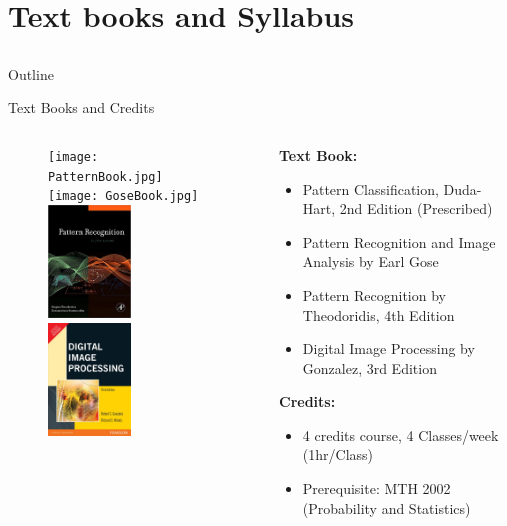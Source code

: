 \section{Text books and Syllabus}
\subsection{}

\begin{frame}[label=12]{Outline}
\tableofcontents
\end{frame}

\begin{frame}{Text Books and Credits}
\begin{columns}
\begin{column}{5cm}
\begin{figure}
\centering
\texttt{[image: PatternBook.jpg]}~~
\texttt{[image: GoseBook.jpg]}\\
\vspace{8pt}
\includegraphics[height = 3cm,width = 2.2cm]{Figures/Book003.jpg}~~
\includegraphics[height = 3cm,width = 2.2cm]{Figures/Book004.jpg}
\end{figure}
\end{column}
\begin{column}{5.4cm}
\begin{footnotesize}
\textbf{Text Book:}
\begin{itemize}
\item Pattern Classification, Duda-Hart, 2nd Edition ({\color{brown}Prescribed})
\item Pattern Recognition and Image Analysis by Earl Gose
\item Pattern Recognition by Theodoridis, 4th Edition
\item Digital Image Processing by Gonzalez, 3rd Edition
\end{itemize}
\textbf{Credits:}
\begin{itemize}
\item 4 credits course, 4 Classes/week (1hr/Class)
\item Prerequisite: MTH 2002 (Probability and Statistics)
\end{itemize}
\end{footnotesize}
\end{column}
\end{columns}
\end{frame}

